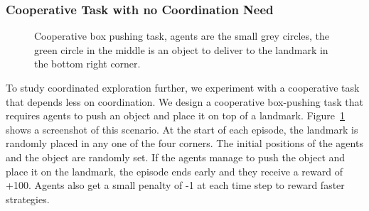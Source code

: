\subsubsection{Cooperative Task with no Coordination Need}

\begin{figure}[h]
    \centering
    \setlength{\fboxsep}{0pt}
    \setlength{\fboxrule}{1pt}
    \caption{Cooperative box pushing task, agents are the small grey circles, the green circle in the middle is an object to deliver to the landmark in the bottom right corner.}
    \label{fig:JIM:cooppush}
\end{figure}

To study coordinated exploration further, we experiment with a cooperative task that depends less on coordination. We design a cooperative box-pushing task that requires agents to push an object and place it on top of a landmark. Figure~\ref{fig:JIM:cooppush} shows a screenshot of this scenario. At the start of each episode, the landmark is randomly placed in any one of the four corners. The initial positions of the agents and the object are randomly set. If the agents manage to push the object and place it on the landmark, the episode ends early and they receive a reward of +100. Agents also get a small penalty of -1 at each time step to reward faster strategies. 

